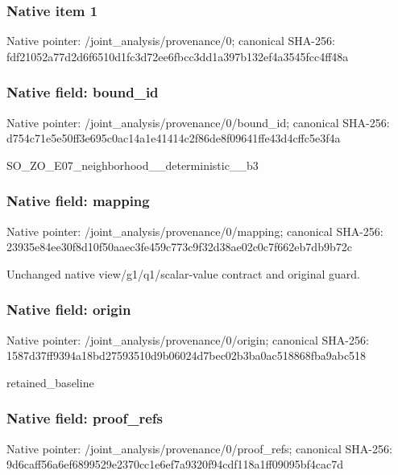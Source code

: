 \documentclass[10pt,a4paper]{article}
\begin{document}
\subsubsection{Native item 1}
Native pointer: /joint\_\allowbreak{}analysis/provenance/0; canonical SHA-256: fdf21052a77d2d6f6510d1fc3d72ee6fbcc3dd1a397b132ef4a3545fcc4ff48a

\subsubsection{Native field: bound\_\allowbreak{}id}
Native pointer: /joint\_\allowbreak{}analysis/provenance/0/bound\_\allowbreak{}id; canonical SHA-256: d754c71e5e50ff3e695c0ac14a1e41414c2f86de8f09641ffe43d4cffc5e3f4a

\begingroup\raggedright\sloppy SO\_\allowbreak{}ZO\_\allowbreak{}E07\_\allowbreak{}neighborhood\_\allowbreak{}\_\allowbreak{}deterministic\_\allowbreak{}\_\allowbreak{}b3\par\endgroup

\subsubsection{Native field: mapping}
Native pointer: /joint\_\allowbreak{}analysis/provenance/0/mapping; canonical SHA-256: 23935e84ee30f8d10f50aaec3fe459c773c9f32d38ae02c0c7f662eb7db9b72c

\begingroup\raggedright\sloppy Unchanged native view/\allowbreak{}g1/\allowbreak{}q1/\allowbreak{}scalar-value contract and original guard.\par\endgroup

\subsubsection{Native field: origin}
Native pointer: /joint\_\allowbreak{}analysis/provenance/0/origin; canonical SHA-256: 1587d37ff9394a18bd27593510d9b06024d7bec02b3ba0ac518868fba9abc518

\begingroup\raggedright\sloppy retained\_\allowbreak{}baseline\par\endgroup

\subsubsection{Native field: proof\_\allowbreak{}refs}
Native pointer: /joint\_\allowbreak{}analysis/provenance/0/proof\_\allowbreak{}refs; canonical SHA-256: 9d6caff56a6ef6899529e2370cc1e6ef7a9320f94cdf118a1ff09095bf4cac7d
\end{document}
